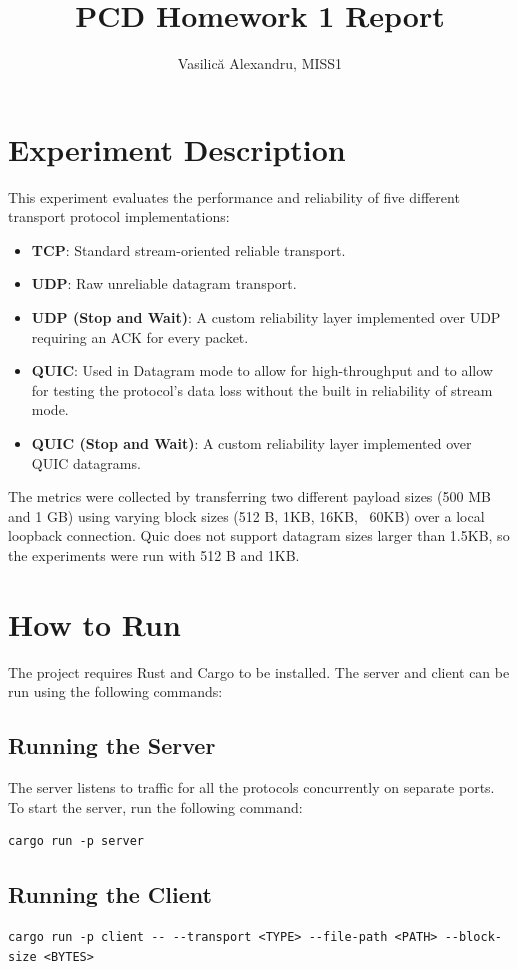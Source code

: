 \documentclass{article}
\title{PCD Homework 1 Report}
\author{Vasilică Alexandru, MISS1}
\begin{document}
\maketitle

\section{Experiment Description}
This experiment evaluates the performance and reliability of five different transport protocol implementations:
\begin{itemize}
    \item \textbf{TCP}: Standard stream-oriented reliable transport.
    \item \textbf{UDP}: Raw unreliable datagram transport.
    \item \textbf{UDP (Stop and Wait)}: A custom reliability layer implemented over UDP requiring an ACK for every packet.
    \item \textbf{QUIC}: Used in Datagram mode to allow for high-throughput and to allow for testing the protocol's data loss without the built in reliability of stream mode.
    \item \textbf{QUIC (Stop and Wait)}: A custom reliability layer implemented over QUIC datagrams.
\end{itemize}

The metrics were collected by transferring two different payload sizes (500 MB and 1 GB) using varying block sizes (512 B, 1KB, 16KB, ~60KB) over a local loopback connection. Quic does not support datagram sizes larger than 1.5KB, so the experiments were run with 512 B and 1KB.

\section{How to Run}
The project requires Rust and Cargo to be installed. The server and client can be run using the following commands:
\subsection{Running the Server}

The server listens to traffic for all the protocols concurrently on separate ports. To start the server, run the following command:

\begin{verbatim}
cargo run -p server
\end{verbatim}

\subsection{Running the Client}
\begin{verbatim}
cargo run -p client -- --transport <TYPE> --file-path <PATH> --block-size <BYTES>
\end{verbatim}
\end{document}

